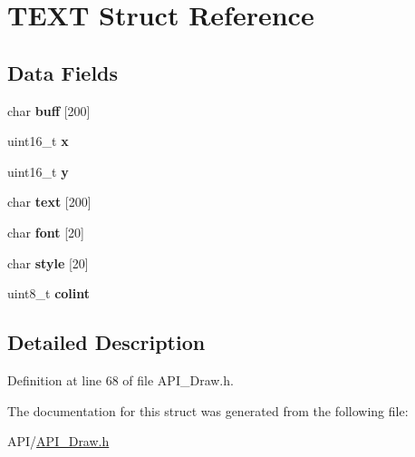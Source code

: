 \hypertarget{struct_t_e_x_t}{}\section{T\+E\+XT Struct Reference}
\label{struct_t_e_x_t}
\subsection*{Data Fields}
\begin{DoxyCompactItemize}
\item 
\mbox{\label{struct_t_e_x_t_a2f784963b0fa863258ed0ac79e9940fb}} 
char {\bfseries buff} \mbox{[}200\mbox{]}
\item 
\mbox{\label{struct_t_e_x_t_a4dde988b1b2adba65ae3efa69f65d960}} 
uint16\+\_\+t {\bfseries x}
\item 
\mbox{\label{struct_t_e_x_t_ab0580f504a7428539be299fa71565f30}} 
uint16\+\_\+t {\bfseries y}
\item 
\mbox{\label{struct_t_e_x_t_a50cee21aace972bab778fcf9df69a4ae}} 
char {\bfseries text} \mbox{[}200\mbox{]}
\item 
\mbox{\label{struct_t_e_x_t_a333e02dd657fb6d02f928075a9ed9119}} 
char {\bfseries font} \mbox{[}20\mbox{]}
\item 
\mbox{\label{struct_t_e_x_t_a34df1ac1fb51661ced6c422e491bf638}} 
char {\bfseries style} \mbox{[}20\mbox{]}
\item 
\mbox{\label{struct_t_e_x_t_a21caa4b27a71b7967f1a2d64f196a674}} 
uint8\+\_\+t {\bfseries colint}
\end{DoxyCompactItemize}


\subsection{Detailed Description}


Definition at line 68 of file A\+P\+I\+\_\+\+Draw.\+h.



The documentation for this struct was generated from the following file\+:\begin{DoxyCompactItemize}
\item 
A\+P\+I/\hyperlink{_a_p_i___draw_8h}{A\+P\+I\+\_\+\+Draw.\+h}\end{DoxyCompactItemize}
